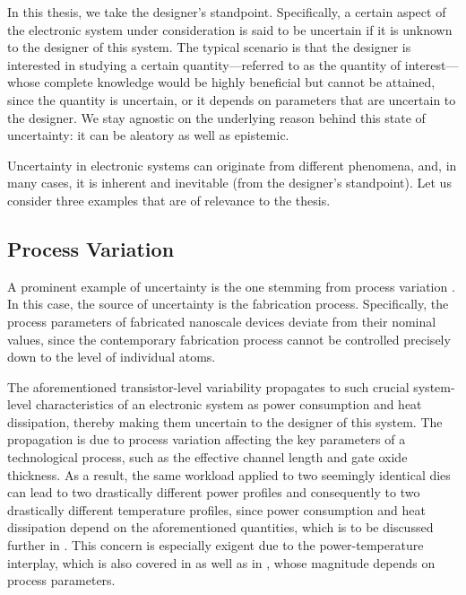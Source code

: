 In this thesis, we take the designer's standpoint. Specifically, a certain
aspect of the electronic system under consideration is said to be uncertain if
it is unknown to the designer of this system. The typical scenario is that the
designer is interested in studying a certain quantity---referred to as the
quantity of interest---whose complete knowledge would be highly beneficial but
cannot be attained, since the quantity \perse is uncertain, or it depends on
parameters that are uncertain to the designer. We stay agnostic on the
underlying reason behind this state of uncertainty: it can be aleatory as well
as epistemic.

Uncertainty in electronic systems can originate from different phenomena, and,
in many cases, it is inherent and inevitable (from the designer's standpoint).
Let us consider three examples that are of relevance to the thesis.

\subsection{Process Variation}

A prominent example of uncertainty is the one stemming from process variation
\cite{chandrakasan2000, srivastava2010}. In this case, the source of uncertainty
is the fabrication process. Specifically, the process parameters of fabricated
nanoscale devices deviate from their nominal values, since the contemporary
fabrication process cannot be controlled precisely down to the level of
individual atoms.

The aforementioned transistor-level variability propagates to such crucial
system-level characteristics of an electronic system as power consumption and
heat dissipation, thereby making them uncertain to the designer of this system.
The propagation is due to process variation affecting the key parameters of a
technological process, such as the effective channel length and gate oxide
thickness. As a result, the same workload applied to two seemingly identical
dies can lead to two drastically different power profiles and consequently to
two drastically different temperature profiles, since power consumption and heat
dissipation depend on the aforementioned quantities, which is to be discussed
further in . This concern is especially exigent due to the
power-temperature interplay, which is also covered in  as well
as in , whose magnitude depends on process parameters.


